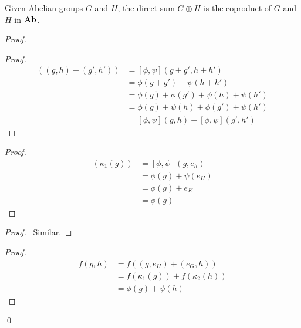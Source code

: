 \begin{prop}
    Given Abelian groups $G$ and $H$, the direct sum $G \oplus H$ is the coproduct of $G$ and $H$ in $\mathbf{Ab}$.
\end{prop}

\begin{proof}
    \pf
    \begin{proof}
        \pf
        \begin{align*}
            [\phi,\psi]((g,h) + (g',h')) & = [\phi,\psi](g + g', h + h')             \\
                                         & = \phi(g + g') + \psi(h + h')             \\
                                         & = \phi(g) + \phi(g') + \psi(h) + \psi(h') \\
                                         & = \phi(g) + \psi(h) + \phi(g') + \psi(h') \\
                                         & = [\phi,\psi](g,h) + [\phi,\psi](g',h')
        \end{align*}
    \end{proof}
    \begin{proof}
        \pf
        \begin{align*}
            [\phi,\psi](\kappa_1(g)) & = [\phi,\psi](g,e_h)  \\
                                     & = \phi(g) + \psi(e_H) \\
                                     & = \phi(g) + e_K       \\
                                     & = \phi(g)
        \end{align*}
    \end{proof}
    \begin{proof}
        \pf\ Similar.
    \end{proof}
    \begin{proof}
        \pf
        \begin{align*}
            f(g,h) & = f((g,e_H) + (e_G,h))            \\
                   & = f(\kappa_1(g)) + f(\kappa_2(h)) \\
                   & = \phi(g) + \psi(h)
        \end{align*}
    \end{proof}
    \qed
\end{proof}

